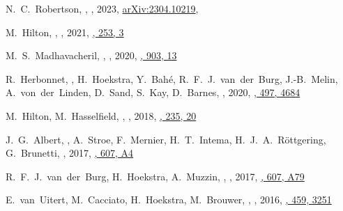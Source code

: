 
\item
N.~C.~Robertson, \myself, 
,
2023, \href{https://ui.adsabs.harvard.edu/abs/2023arXiv230410219R/abstract}{arXiv:2304.10219},

\item
M.~Hilton, \myself, 
,
2021, \href{https://ui.adsabs.harvard.edu/abs/2020arXiv200911043H/abstract}{\apjs, 253, 3}

\item
M.~S.~Madhavacheril, \myself, 
,
2020, \href{https://ui.adsabs.harvard.edu/abs/2020arXiv200907772M/abstract}{\apjl, 903, 13}

\item
R.~Herbonnet, \myself, H.~Hoekstra, Y.~Bah\'e, R.~F.~J.~van~der~Burg, 
J.-B.~Melin, A.~von~der~Linden, D.~Sand, S.~Kay, D.~Barnes,
,
2020, \href{https://ui.adsabs.harvard.edu/abs/2020MNRAS.497.4684H/abstract}{\mnras, 497, 4684}

\item
M.~Hilton, M.~Hasselfield, \myself, 
,
2018, \href{https://ui.adsabs.harvard.edu/abs/2018ApJS..235...20H}{\apjs, 235, 20}

\item
J.~G.~Albert, \myself, A.~Stroe, F.~Mernier, H.~T.~Intema, H.~J.~A.~R\"ottgering, 
G.~Brunetti,
,
2017, \href{https://ui.adsabs.harvard.edu/abs/2017A&A...607A...4A}{\aap, 607, A4}

\item
R.~F.~J.~van~der~Burg, H.~Hoekstra, A.~Muzzin, \myself, 
,
2017, \href{https://ui.adsabs.harvard.edu/abs/2017A&A...607A..79V}{\aap, 607, A79}

\item
E.~van~Uitert, M.~Cacciato, H.~Hoekstra, M.~Brouwer, \myself, 
,
2016, \href{https://ui.adsabs.harvard.edu/abs/2016MNRAS.459.3251V}{\mnras, 459, 3251}

